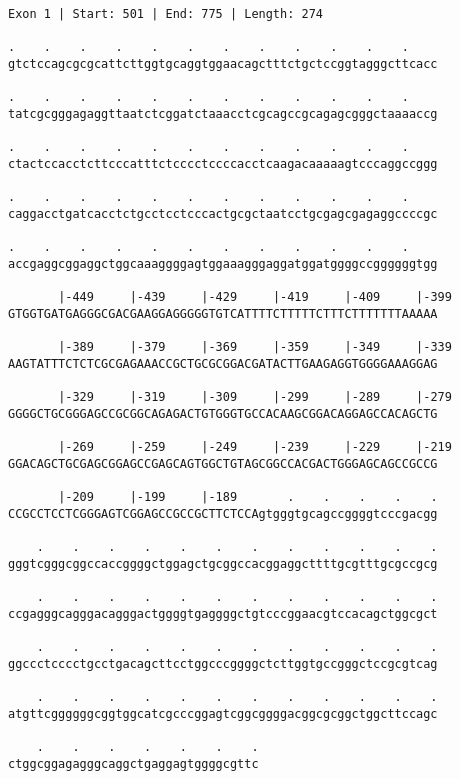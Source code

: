 \documentclass{article}
\begin{document}
\begin{Verbatim}
Exon 1 | Start: 501 | End: 775 | Length: 274
 
.    .    .    .    .    .    .    .    .    .    .    .    
gtctccagcgcgcattcttggtgcaggtggaacagctttctgctccggtagggcttcacc
  
.    .    .    .    .    .    .    .    .    .    .    .    
tatcgcgggagaggttaatctcggatctaaacctcgcagccgcagagcgggctaaaaccg
  
.    .    .    .    .    .    .    .    .    .    .    .    
ctactccacctcttcccatttctcccctccccacctcaagacaaaaagtcccaggccggg
  
.    .    .    .    .    .    .    .    .    .    .    .    
caggacctgatcacctctgcctcctcccactgcgctaatcctgcgagcgagaggccccgc
  
.    .    .    .    .    .    .    .    .    .    .    .    
accgaggcggaggctggcaaaggggagtggaaagggaggatggatggggccggggggtgg
  
       |-449     |-439     |-429     |-419     |-409     |-399
GTGGTGATGAGGGCGACGAAGGAGGGGGTGTCATTTTCTTTTTCTTTCTTTTTTTAAAAA
  
       |-389     |-379     |-369     |-359     |-349     |-339
AAGTATTTCTCTCGCGAGAAACCGCTGCGCGGACGATACTTGAAGAGGTGGGGAAAGGAG
  
       |-329     |-319     |-309     |-299     |-289     |-279
GGGGCTGCGGGAGCCGCGGCAGAGACTGTGGGTGCCACAAGCGGACAGGAGCCACAGCTG
  
       |-269     |-259     |-249     |-239     |-229     |-219
GGACAGCTGCGAGCGGAGCCGAGCAGTGGCTGTAGCGGCCACGACTGGGAGCAGCCGCCG
  
       |-209     |-199     |-189       .    .    .    .    .
CCGCCTCCTCGGGAGTCGGAGCCGCCGCTTCTCCAgtgggtgcagccggggtcccgacgg
  
    .    .    .    .    .    .    .    .    .    .    .    .
gggtcgggcggccaccggggctggagctgcggccacggaggcttttgcgtttgcgccgcg
  
    .    .    .    .    .    .    .    .    .    .    .    .
ccgagggcagggacagggactggggtgaggggctgtcccggaacgtccacagctggcgct
  
    .    .    .    .    .    .    .    .    .    .    .    .
ggccctcccctgcctgacagcttcctggcccggggctcttggtgccgggctccgcgtcag
  
    .    .    .    .    .    .    .    .    .    .    .    .
atgttcggggggcggtggcatcgcccggagtcggcggggacggcgcggctggcttccagc
  
    .    .    .    .    .    .    .
ctggcggagagggcaggctgaggagtggggcgttc
\end{Verbatim}
\newpage
\end{document}
